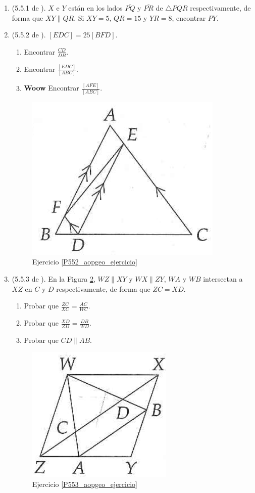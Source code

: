 \begin{enumerate}
	\item \label{P551_aopgeo_ejercicio} (5.5.1 de \cite{Aops_Geometria}). $X$ e $Y$ están en los lados $\overline{PQ}$ y $\overline{PR}$ de $\triangle PQR$ respectivamente, de forma que $XY \parallel QR$. Si $XY = 5$, $QR=15$ y $YR=8$, encontrar $PY$.
	\item \label{P552_aopgeo_ejercicio} (5.5.2 de \cite{Aops_Geometria}). $[EDC]=25[BFD]$.
			\begin{enumerate}[label=\Alph*)]
				\item Encontrar $\frac{CD}{DB}$.
				\item Encontrar $\frac{[EDC]}{[ABC]}$.
				\item \textbf{Woow} Encontrar $\frac{[AFE]}{[ABC]}$.
			\end{enumerate}
	\begin{figure}[H]
		\centering
		\includegraphics[width=0.4\linewidth]{Geometria/imgs/552_aopgeo_ejer}
		\caption{Ejercicio \ref{P552_aopgeo_ejercicio} }
		\label{552_aopgeo}
	\end{figure}

	\item \label{P553_aopgeo_ejercicio} (5.5.3 de \cite{Aops_Geometria}). En la Figura \ref{553_aopgeo}, $WZ\parallel XY$ y $WX\parallel ZY$, $WA$ y $WB$ intersectan a $XZ$ en $C$ y $D$ respectivamente, de forma que $ZC=XD$.
	\begin{enumerate}[label=\Alph*)]
		\item Probar que $\frac{ZC}{XC} = \frac{AC}{WC}$.
		\item Probar que $\frac{XD}{ZD} = \frac{DB}{WD}$.
		\item Probar que $CD\parallel AB$.
	\end{enumerate}
	\begin{figure}[H]
		\centering
		\includegraphics[width=0.3\linewidth]{Geometria/imgs/553_aopgeo_ejer}
		\caption{Ejercicio \ref{P553_aopgeo_ejercicio} }
		\label{553_aopgeo}
	\end{figure}		
	

\end{enumerate}
